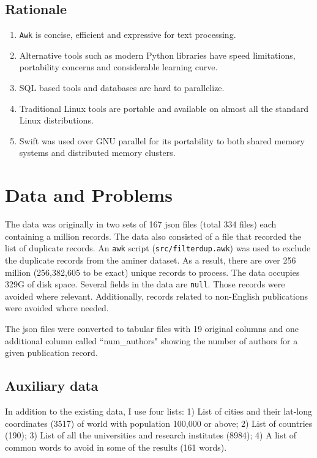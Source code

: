 \documentclass{article}
\begin{document}
\subsection*{Rationale}
\begin{enumerate}
\item \texttt{Awk} is concise, efficient and expressive for text processing.
\item Alternative tools such as modern Python libraries have speed limitations, portability concerns and considerable learning curve.
\item SQL based tools and databases are hard to parallelize.
\item Traditional Linux tools are portable and available on almost all the standard Linux distributions.
\item Swift was used over GNU parallel for its portability to both shared memory systems and distributed memory clusters.
\end{enumerate}

\section*{Data and Problems}
The data was originally in two sets of 167 json files (total 334 files) each
containing a million records. The data also consisted of a file that recorded
the list of duplicate records. An \texttt{awk} script
(\texttt{src/filterdup.awk}) was used to exclude the duplicate records from the
aminer dataset. As a result, there are over 256 million (256,382,605 to be
exact) unique records to process. The data occupies 329G of disk space. Several
fields in the data are \texttt{null}. Those records were avoided where
relevant. Additionally, records related to non-English publications were
avoided where needed.

The json files were converted to tabular files with 19 original columns and one
additional column called ``num\_authors" showing the number of authors for a given
publication record.

\subsection*{Auxiliary data}
In addition to the existing data, I use four lists: 1) List of cities and their
lat-long coordinates (3517) of world with population 100,000 or above; 2) List
of countries (190); 3) List of all the universities and research institutes
(8984); 4) A list of common words to avoid in some of the results (161 words).
\end{document}
